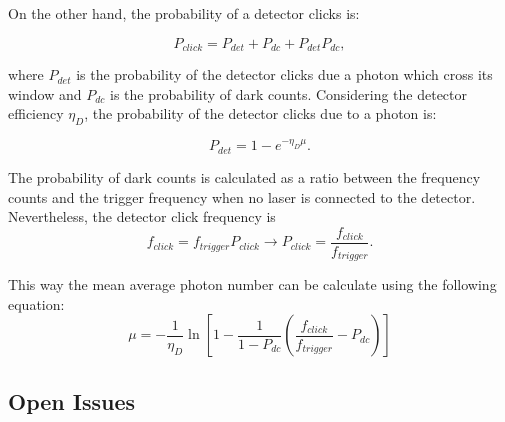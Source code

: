 On the other hand, the probability of a detector clicks is:

\begin{equation}\label{eq:detectorclickprob}
  P_{click} = P_{det}+P_{dc} + P_{det}P_{dc},
\end{equation}

where $P_{det}$ is the probability of the detector clicks due a photon which cross its window and $P_{dc}$ is the probability of dark counts. Considering the detector efficiency $\eta_{D}$, the probability of the detector clicks due to a photon is:

\begin{equation}\label{eq:probclickefficiency}
  P_{det} = 1 - e^{- \eta_{D}\mu}.
\end{equation}

The probability of dark counts is calculated as a ratio between the frequency counts and the trigger frequency when no laser is connected to the detector. Nevertheless, the detector click frequency is
\begin{equation}\label{eq:frequencyclick}
  f_{click} = f_{trigger}P_{click} \longrightarrow P_{click}=\frac{f_{click}}{f_{trigger}}.
\end{equation}

This way the mean average photon number can be calculate using the following equation:
\begin{equation}\label{eq:meanphotonnumber}
  \mu = - \frac{1}{\eta_{D}}\ln\left [1-\frac{1}{1-P_{dc}}\left (\frac{f_{click}}{f_{trigger}}-P_{dc} \right)\right]
\end{equation}

\subsection{Open Issues}

\newpage



\renewcommand{\bibname}{References}
%


%
%


\cleardoublepage
